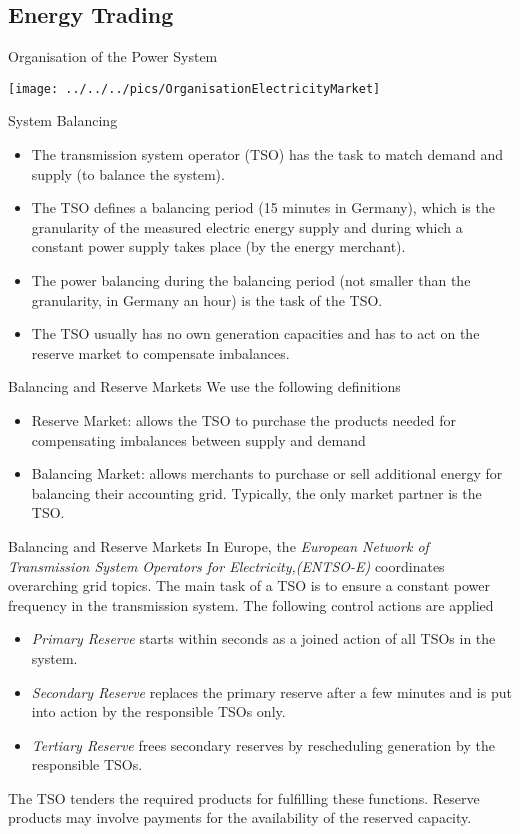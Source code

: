 
\subsection{Energy Trading}

{Organisation of the Power System}
\begin{center}
\texttt{[image: ../../../pics/OrganisationElectricityMarket]}
\end{center}

{System Balancing}
\begin{itemize}
\item<1-> The transmission system operator (TSO) has the task to match demand and supply (to balance the system).
\item<2-> The TSO defines a balancing period (15 minutes in Germany), which is the granularity of the measured electric energy supply and during which a constant power supply takes place (by the energy merchant).
\item<3->  The power balancing during the balancing period (not smaller than the granularity, in Germany an hour) is the task of the TSO.
\item<4-> The TSO usually has no own generation capacities and has to act on the reserve market to compensate imbalances.
\end{itemize}

{Balancing and Reserve Markets}
We use the following definitions
\begin{itemize}
\item<1-> Reserve Market: allows the TSO to purchase the products needed for compensating imbalances between supply and demand
\item<2->  Balancing Market: allows merchants to purchase or sell additional energy for balancing their accounting grid. Typically, the only market partner is the TSO.
\end{itemize}

{Balancing and Reserve Markets}
In Europe, the {\it European Network of Transmission System Operators for Electricity,(ENTSO-E)} coordinates overarching grid topics. The main task of a TSO is to ensure a constant power frequency in the transmission system. The following control actions are applied
\begin{itemize}
\item<1->{\it Primary Reserve}   starts within seconds as a joined action of all TSOs in the system.
\item<2-> {\it Secondary Reserve} replaces the primary reserve after a few minutes and is put into action by the responsible TSOs only.
\item<3->{\it Tertiary Reserve} frees secondary reserves by rescheduling generation by the responsible TSOs.
\end{itemize}
The TSO tenders the required products for fulfilling these functions. Reserve products may involve payments for the availability of the reserved capacity.

